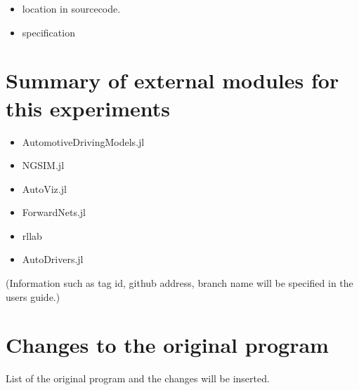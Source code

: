 \begin{itemize}
\item location in sourcecode.
\item specification
\end{itemize}

\section{Summary of external modules for this experiments}

\begin{itemize}
\item AutomotiveDrivingModels.jl
\item NGSIM.jl
\item AutoViz.jl
\item ForwardNets.jl
\item rllab
\item AutoDrivers.jl
\end{itemize}

(Information such as tag id, github address, branch name will be specified in the users guide.)

\section{Changes to the original program}


List of the original program and the changes will be inserted.

